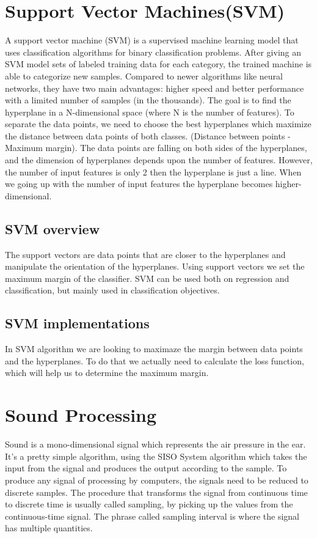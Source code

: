 \documentclass[english,12pt,oneside,a4paper]{article}
\begin{document}
\begin{center}
		\section{Support Vector Machines(SVM)}
		A support vector machine (SVM) is a supervised machine learning model that uses classification algorithms for binary classification problems. After giving an SVM model sets of labeled training data for each category, the trained machine is able to categorize new samples. Compared to newer algorithms like neural networks, they have two main advantages: higher speed and better performance with a limited number of samples (in the thousands).
		The goal is to find the hyperplane in a N-dimensional space (where N is the number of features). To separate the data points, we need to choose the best hyperplanes which maximize the distance between data points of both classes. (Distance between points - Maximum margin). The data points are falling on both sides of the hyperplanes, and the dimension of hyperplanes depends upon the number of features. However, the number of input features is only 2 then the hyperplane is just a line. When we going up with the number of input features the hyperplane becomes higher-dimensional.
		\subsection{SVM overview}
		The support vectors are data points that are closer to the hyperplanes and manipulate the orientation of the hyperplanes. Using support vectors we set the maximum margin of the classifier.
		SVM can be used both on regression and classification, but mainly used in classification objectives.
		\subsection{SVM implementations}
		In SVM algorithm we are looking to maximaze the margin between data points and the hyperplanes. To do that we actually need to calculate the loss function, which will help us to determine the maximum margin.
		\section{Sound Processing}
		Sound is a mono-dimensional signal which represents the air pressure in the ear. It's a pretty simple algorithm, using the SISO System algorithm which takes the input from the signal and produces the output according to the sample. To produce any signal of processing by computers, the signals need to be reduced to discrete samples. The procedure that transforms the signal from continuous time to discrete time is usually called sampling, by picking up the values from the continuous-time signal. The phrase called sampling interval is where the signal has multiple quantities.

\end{center}
\end{document}
